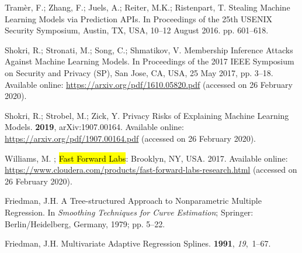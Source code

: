 \documentclass[information,article,accept,moreauthors,pdftex]{Definitions/mdpi}
\begin{document}
{\begin{thebibliography}{999}
Tram{\`e}r, F.; Zhang, F.; Juels, A.; Reiter, M.K.; Ristenpart, T.
\newblock Stealing {M}achine {L}earning {M}odels via {P}rediction {A}{P}{I}s.
\newblock In Proceedings of the 25th USENIX Security Symposium, Austin, TX, USA, 10--12 August 2016. pp. 601--618.

Shokri, R.; Stronati, M.; Song, C.; Shmatikov, V.
\newblock Membership {I}nference {A}ttacks {A}gainst {M}achine {L}earning
  {M}odels.
\newblock  In Proceedings of the 2017 IEEE Symposium on Security and Privacy (SP), San Jose, CA, USA, 25 May 2017, pp.
  3--18.
\newblock Available online: \url{https://arxiv.org/pdf/1610.05820.pdf} (accessed on 26 February 2020).

Shokri, R.; Strobel, M.; Zick, Y.
\newblock Privacy {R}isks of {E}xplaining {M}achine {L}earning {M}odels.
 {\bf 2019}, arXiv:1907.00164.
\newblock Available online: \url{https://arxiv.org/pdf/1907.00164.pdf} (accessed on 26 February 2020).

Williams, M.
; \hl{Fast Forward Labs}: Brooklyn, NY, USA.  2017.   %
\newblock Available online: 
  \url{https://www.cloudera.com/products/fast-forward-labs-research.html} (accessed on 26 February 2020).

Friedman, J.H.
\newblock A {T}ree-structured {A}pproach to {N}onparametric {M}ultiple
  {R}egression. In {\em Smoothing Techniques for Curve Estimation}; Springer: {Berlin/Heidelberg, Germany,} 
  1979; pp. 5--22.

Friedman, J.H.
\newblock Multivariate {A}daptive {R}egression {S}plines.
 {\bf 1991}, {\em 19},~1--67.


\end{thebibliography}}
\end{document}
